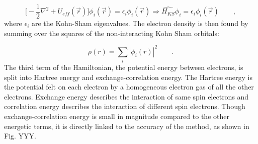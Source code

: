 \documentclass[3p,review,12pt]{elsarticle}
\begin{document}
 \begin{equation}
 \bigg[-\frac{1}{2}\nabla^{2}+U_{eff}(\vec{r})\bigg]\phi_{i}(\vec{r}) = \epsilon_{i}\phi_{i}(\vec{r}) \Rightarrow \hat{H_{KS}}\phi_{i} = \epsilon_{i}\phi_{i}(\vec{r}) \qquad ,
 \end{equation}
where $\epsilon_{i}$ are the Kohn-Sham eigenvalues. The electron density is then found by summing over the squares of the non-interacting Kohn Sham orbitals:

\begin{equation}
\rho (r) = \sum_{i}|\phi _{i}(r)|^{2} \qquad.
\end{equation}
The third term of the Hamiltonian, the potential energy between electrons, is split into Hartree energy and exchange-correlation energy. The Hartree energy is  the potential felt on each electron by a homogeneous electron gas of all the other electrons. Exchange energy describes the interaction of same spin electrons and correlation energy describes the interaction of different spin electrons. Though exchange-correlation energy is small in magnitude compared to the other energetic terms, it is directly linked to the accuracy of the method, as shown in Fig. YYY. 
\end{document}

